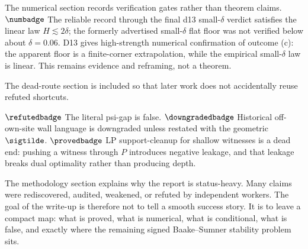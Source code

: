 The numerical section records verification gates rather than theorem claims.
\(\numbadge\) The reliable record through the final d13 small-\(\delta\)
verdict satisfies the linear law \(H\lesssim2\delta\); the formerly advertised
small-\(\delta\) flat floor was not verified below about \(\delta=0.06\).
D13 gives high-strength numerical confirmation of outcome (c): the apparent
floor is a finite-corner extrapolation, while the empirical small-\(\delta\)
law is linear.  This remains evidence and reframing, not a theorem.

The dead-route section is included so that later work does not accidentally
reuse refuted shortcuts.

\noindent\(\refutedbadge\) The literal psi-gap is false.  \(\downgradedbadge\)
Historical off-own-site wall language is downgraded unless restated with the
geometric \(\sigtilde\).  \(\provedbadge\) LP support-cleanup for shallow
witnesses is a dead end: pushing a witness through \(P\) introduces negative
leakage, and that leakage breaks dual optimality rather than producing depth.

The methodology section explains why the report is status-heavy.  Many claims
were rediscovered, audited, weakened, or refuted by independent workers.  The
goal of the write-up is therefore not to tell a smooth success story.  It is
to leave a compact map: what is proved, what is numerical, what is conditional,
what is false, and exactly where the remaining signed Baake--Sumner stability
problem sits.
